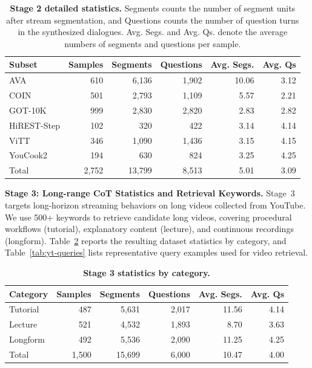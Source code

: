 \documentclass{article}
\begin{document}
\begin{table}[!htbp]
  \caption{\textbf{Stage 2 detailed statistics.}
  Segments counts the number of segment units after stream segmentation, and Questions counts the number of question turns in the synthesized dialogues. Avg. Segs. and Avg. Qs. denote the average numbers of segments and questions per sample.}
  \label{tab:multi-turn-detail}
  \centering
  \small
  \begin{tabular}{lrrrrr}
    \toprule
    \textbf{Subset} & \textbf{Samples} & \textbf{Segments} & \textbf{Questions} & \textbf{Avg. Segs.} & \textbf{Avg. Qs} \\
    \midrule
    AVA & 610 & 6,136 & 1,902 & 10.06 & 3.12 \\
    COIN & 501 & 2,793 & 1,109 & 5.57 & 2.21 \\
    GOT-10K & 999 & 2,830 & 2,820 & 2.83 & 2.82 \\
    HiREST-Step & 102 & 320 & 422 & 3.14 & 4.14 \\
    ViTT & 346 & 1,090 & 1,436 & 3.15 & 4.15 \\
    YouCook2 & 194 & 630 & 824 & 3.25 & 4.25 \\
    \midrule
    Total & 2,752 & 13,799 & 8,513 & 5.01 & 3.09 \\
    \bottomrule
  \end{tabular}
\end{table}

\noindent\textbf{Stage 3: Long-range CoT Statistics and Retrieval Keywords.}
\label{app:stage3}
Stage~3 targets long-horizon streaming behaviors on long videos collected from YouTube. We use 500+ keywords to retrieve candidate long videos, covering procedural workflows (tutorial), explanatory content (lecture), and continuous recordings (longform). Table~\ref{tab:stage3-detail} reports the resulting dataset statistics by category, and Table~\ref{tab:yt-queries} lists representative query examples used for video retrieval.

\begin{table}[t]
  \caption{\textbf{Stage 3 statistics by category.}}
  \label{tab:stage3-detail}
  \centering
  \small
  \begin{tabular}{lrrrrr}
    \toprule
    \textbf{Category} & \textbf{Samples} & \textbf{Segments} & \textbf{Questions} & \textbf{Avg. Segs.} & \textbf{Avg. Qs} \\
    \midrule
    Tutorial & 487 & 5,631 & 2,017 & 11.56 & 4.14 \\
    Lecture  & 521 & 4,532 & 1,893 & 8.70  & 3.63 \\
    Longform & 492 & 5,536 & 2,090 & 11.25 & 4.25 \\
    \midrule
    Total & 1,500 & 15,699 & 6,000 & 10.47 & 4.00 \\
    \bottomrule
  \end{tabular}
\end{table}
\end{document}
